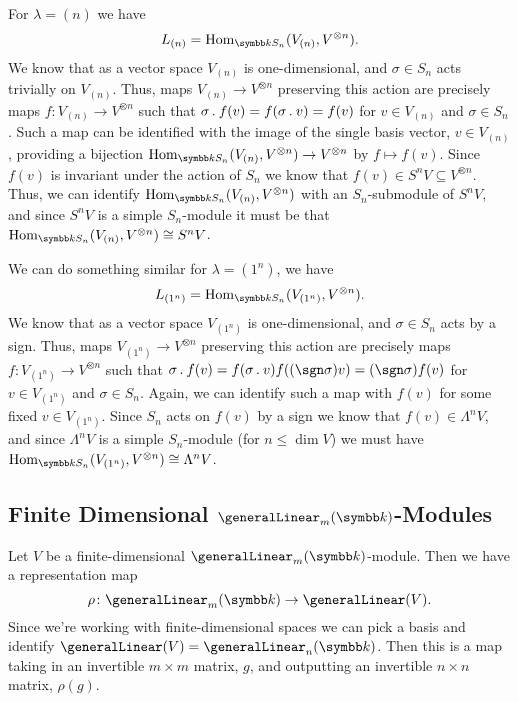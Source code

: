 \begin{exm}{}{}
    For \(\lambda = (n)\) we have
    \begin{equation}
        L_{(n)} = \Hom_{\field S_n}(V_{(n)}, V^{\otimes n}).
    \end{equation}
    We know that as a vector space \(V_{(n)}\) is one-dimensional, and \(\sigma \in S_n\) acts trivially on \(V_{(n)}\).
    Thus, maps \(V_{(n)} \to V^{\otimes n}\) preserving this action are precisely maps \(f \colon V_{(n)} \to V^{\otimes n}\) such that \(\sigma \mathbin{.} f(v) = f(\sigma \mathbin{.} v) = f(v)\) for \(v \in V_{(n)}\) and \(\sigma \in S_n\).
    Such a map can be identified with the image of the single basis vector, \(v \in V_{(n)}\), providing a bijection \(\Hom_{\field S_n}(V_{(n)}, V^{\otimes n}) \to V^{\otimes n}\) by \(f \mapsto f(v)\).
    Since \(f(v)\) is invariant under the action of \(S_n\) we know that \(f(v) \in S^nV \subseteq V^{\otimes n}\).
    Thus, we can identify \(\Hom_{\field S_n}(V_{(n)}, V^{\otimes n})\) with an \(S_n\)-submodule of \(S^nV\), and since \(S^nV\) is a simple \(S_n\)-module it must be that \(\Hom_{\field S_n}(V_{(n)}, V^{\otimes n}) \isomorphic S^nV\).
    
    We can do something similar for \(\lambda = (1^n)\), we have
    \begin{equation}
        L_{(1^n)} = \Hom_{\field S_n}(V_{(1^n)}, V^{\otimes n}).
    \end{equation}
    We know that as a vector space \(V_{(1^n)}\) is one-dimensional, and \(\sigma \in S_n\) acts by a sign.
    Thus, maps \(V_{(1^n)} \to V^{\otimes n}\) preserving this action are precisely maps \(f \colon V_{(1^n)} \to V^{\otimes n}\) such that \(\sigma \action f(v) = f(\sigma \action v) f((\sgn \sigma) v) = (\sgn \sigma) f(v)\) for \(v \in V_{(1^n)}\) and \(\sigma \in S_n\).
    Again, we can identify such a map with \(f(v)\) for some fixed \(v \in V_{(1^n)}\).
    Since \(S_n\) acts on \(f(v)\) by a sign we know that \(f(v) \in \Lambda^nV\), and since \(\Lambda^nV\) is a simple \(S_n\)-module (for \(n \le \dim V\)) we must have \(\Hom_{\field S_n}(V_{(1^n)}, V^{\otimes n}) \isomorphic \Lambda^nV\).
\end{exm}

\subsection{Finite Dimensional \texorpdfstring{\(\generalLinear_m(\field)\)}{GLm(k)}-Modules}
Let \(V\) be a finite-dimensional \(\generalLinear_m(\field)\)-module.
Then we have a representation map
\begin{equation}
    \rho \colon \generalLinear_m(\field) \to \generalLinear(V).
\end{equation}
Since we're working with finite-dimensional spaces we can pick a basis and identify \(\generalLinear(V) = \generalLinear_n(\field)\).
Then this is a map taking in an invertible \(m \times m\) matrix, \(g\), and outputting an invertible \(n \times n\) matrix, \(\rho(g)\).

